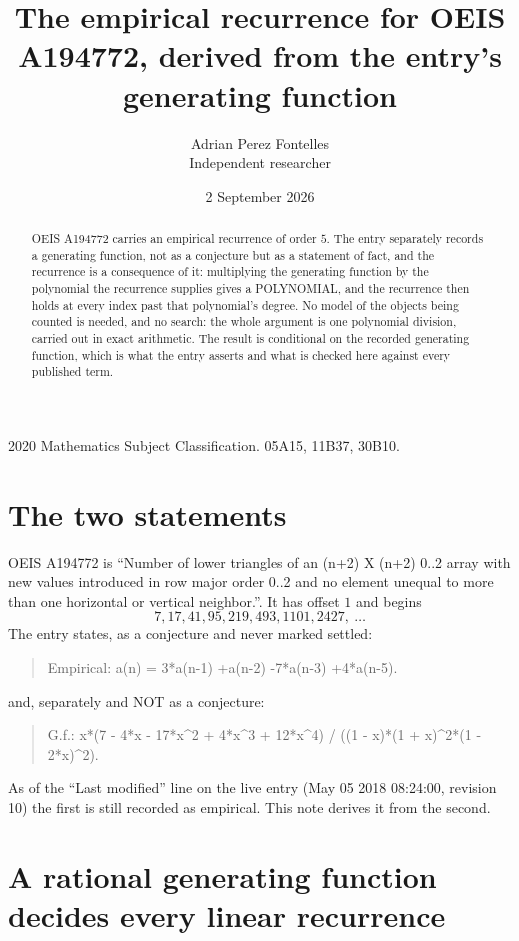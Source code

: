 \documentclass[11pt,a4paper]{article}
\title{The empirical recurrence for OEIS A194772, derived from the entry's generating function}
\author{Adrian Perez Fontelles\\ \small Independent researcher}
\date{2 September 2026}
\theoremstyle{plain}
\theoremstyle{definition}
\begin{document}
\maketitle

\begin{abstract}
OEIS A194772 carries an empirical recurrence of order $5$. The entry separately records a
generating function, not as a conjecture but as a statement of fact, and the recurrence is a
consequence of it: multiplying the generating function by the polynomial the recurrence
supplies gives a POLYNOMIAL, and the recurrence then holds at every index past that
polynomial's degree. No model of the objects being counted is needed, and no search: the
whole argument is one polynomial division, carried out in exact arithmetic. The result is
conditional on the recorded generating function, which is what the entry asserts and what is
checked here against every published term.
\end{abstract}

\noindent\small 2020 Mathematics Subject Classification. 05A15, 11B37, 30B10.\normalsize

\section{The two statements}

OEIS A194772 is ``Number of lower triangles of an (n+2) X (n+2) 0..2 array with new values introduced in row major order 0..2 and no element unequal to more than one horizontal or vertical neighbor.''. It has offset $1$ and begins
\[
7, 17, 41, 95, 219, 493, 1101, 2427,\ \dots
\]
The entry states, as a conjecture and never marked settled:
\begin{quote}
Empirical: a(n) = 3*a(n-1) +a(n-2) -7*a(n-3) +4*a(n-5).
\end{quote}
and, separately and NOT as a conjecture:
\begin{quote}
G.f.: x*(7 - 4*x - 17*x\^{}2 + 4*x\^{}3 + 12*x\^{}4) / ((1 - x)*(1 + x)\^{}2*(1 - 2*x)\^{}2).
\end{quote}
As of the ``Last modified'' line on the live entry (May 05 2018 08:24:00, revision 10) the first is still
recorded as empirical. This note derives it from the second.

\section{A rational generating function decides every linear recurrence}
\end{document}
